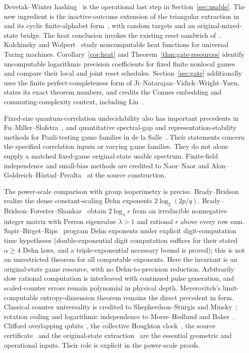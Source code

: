 Devetak--Winter hashing~\cite{DW05} is the operational last step in Section~\ref{sec:usable}. The new ingredient is the inactive-outcome extension of the triangular extraction in~\cite[Theorem~6.2]{DM-precision} and its cyclic finite-alphabet form~\cite[Lemma~6.3]{DM-precision}, with random targets and an original-mixed-state bridge. The heat conclusion invokes the existing reset sandwich of~\cite[Theorem~2.1 and Corollary~2.2]{DM-heat}. Kolchinsky and Wolpert~\cite{KW20} study noncomputable heat functions for universal Turing machines. Corollary~\ref{cor:heat} and Theorem~\ref{thm:gate-resources} identify uncomputable logarithmic precision coefficients for fixed finite nonlocal games and compare their local and joint reset schedules. Section~\ref{sec:gate} additionally uses the finite perfect-completeness form of Ji--Natarajan--Vidick--Wright--Yuen, states its exact theorem numbers, and credits the Connes embedding and commuting-complexity context, including Lin~\cite{Lin25}.

Fixed-size quantum-correlation undecidability also has important precedents in Fu--Miller--Slofstra~\cite{FMS21}, and quantitative spectral-gap and representation-stability methods for Pauli-testing game families in de la Salle~\cite{Salle24}. Their statements concern the specified correlation inputs or varying game families. They do not alone supply a matched fixed-game original-state usable spectrum. Finite-field independence and small-bias methods are credited to Naor--Naor and Alon--Goldreich--H\aa stad--Peralta~\cite{NN93,AGHP92} at the source construction.

The power-scale comparison with group isoperimetry is precise. Brady--Bridson~\cite{BB00} realize the dense constant-scaling Dehn exponents $2\log_2(2p/q)$. Brady--Bridson--Forester--Shankar~\cite[Theorem~A]{BBFS09} obtain $2\log_\lambda r$ from an irreducible nonnegative integer matrix with Perron eigenvalue $\lambda>1$ and rational $r$ above every row sum. Sapir--Birget--Rips~\cite{SBR02} program Dehn exponents under explicit digit-computation time hypotheses (double-exponential digit computation suffices for their stated $\alpha\ge4$ Dehn laws, and a triple-exponential necessary bound is proved); this is not an unrestricted theorem for all computable exponents. Here the invariant is an original-state game resource, with no Dehn-to-precision reduction. Arbitrarily slow rational computation is interleaved with continued pulse generation, and scaled-counter errors remain polynomial in physical depth. Meyerovitch's limit-computable entropy-dimension theorem remains the direct precedent in form. Classical counter universality is credited to Shepherdson--Sturgis and Minsky~\cite{SS63,Min61}; rotation coding and logarithmic independence to Morse--Hedlund and Baker~\cite{MH40,Bak66}. Clifford overlapping qubits~\cite[Theorem~3.1]{CRSV17}, the collective Houghton clock~\cite[Proposition~13.9]{DM-precision}, the source certificate~\cite[Definition~7.1]{DM-game} and the original-state extraction~\cite[Theorems~6.4 and~12.4]{DM-precision} are the essential geometric and operational inputs. Their role is explicit in the power-scale proofs.

